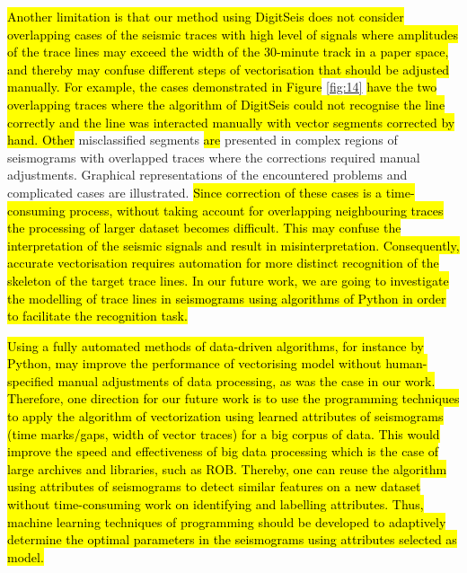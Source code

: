 \documentclass[sensors,article,submit,moreauthors,pdftex]{Definitions/mdpi}
\begin{document}
\hl{Another limitation is that our method using DigitSeis does not consider overlapping cases of the seismic traces with high level of signals where amplitudes of the trace lines may exceed the width of the 30-minute track in a paper space, and thereby may confuse different steps of vectorisation that should be adjusted manually. For example, the cases demonstrated in Figure} \ref{fig:14} \hl{have the two overlapping traces where the algorithm of DigitSeis could not recognise the line correctly and the line was interacted manually with vector segments corrected by hand. Other} misclassified segments \hl{are} presented in complex regions of seismograms with overlapped traces where the corrections required manual adjustments. Graphical representations of the encountered problems and complicated cases are illustrated. \hl{Since correction of these cases is a time-consuming process, without taking account for overlapping neighbouring traces the processing of larger dataset becomes difficult. This may confuse the interpretation of the seismic signals and result in misinterpretation. Consequently, accurate vectorisation requires automation for more distinct recognition of the skeleton of the target trace lines. In our future work, we are going to investigate the modelling of trace lines in seismograms using algorithms of Python in order to facilitate the recognition task.}

\hl{Using a fully automated methods of data-driven algorithms, for instance by Python, may improve the performance of vectorising model without human-specified manual adjustments of data processing, as was the case in our work. Therefore, one direction for our future work is to use the programming techniques to apply the algorithm of vectorization using learned attributes of seismograms (time marks/gaps, width of vector traces) for a big corpus of data. This would improve the speed and effectiveness of big data processing which is the case of large archives and libraries, such as ROB. Thereby, one can reuse the algorithm using attributes of seismograms to detect similar features on a new dataset without time-consuming work on identifying and labelling attributes. Thus, machine learning techniques of programming should be developed to adaptively determine the optimal parameters in the seismograms using attributes selected as model.}
\end{document}
